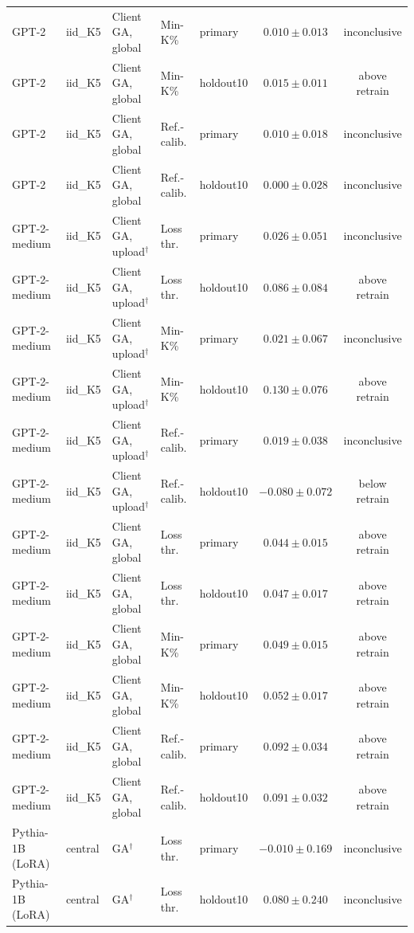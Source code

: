\begin{table}[t]
\begin{tabular*}{\textwidth}{@{\extracolsep{\fill}}lllllcc@{}}
GPT-2 & iid\_K5 & Client GA, global & Min-K\% & primary & $0.010 \pm 0.013$ & inconclusive \\
GPT-2 & iid\_K5 & Client GA, global & Min-K\% & holdout10 & $0.015 \pm 0.011$ & above retrain \\
GPT-2 & iid\_K5 & Client GA, global & Ref.-calib. & primary & $0.010 \pm 0.018$ & inconclusive \\
GPT-2 & iid\_K5 & Client GA, global & Ref.-calib. & holdout10 & $0.000 \pm 0.028$ & inconclusive \\
GPT-2-medium & iid\_K5 & Client GA, upload$^{\dagger}$ & Loss thr. & primary & $0.026 \pm 0.051$ & inconclusive \\
GPT-2-medium & iid\_K5 & Client GA, upload$^{\dagger}$ & Loss thr. & holdout10 & $0.086 \pm 0.084$ & above retrain \\
GPT-2-medium & iid\_K5 & Client GA, upload$^{\dagger}$ & Min-K\% & primary & $0.021 \pm 0.067$ & inconclusive \\
GPT-2-medium & iid\_K5 & Client GA, upload$^{\dagger}$ & Min-K\% & holdout10 & $0.130 \pm 0.076$ & above retrain \\
GPT-2-medium & iid\_K5 & Client GA, upload$^{\dagger}$ & Ref.-calib. & primary & $0.019 \pm 0.038$ & inconclusive \\
GPT-2-medium & iid\_K5 & Client GA, upload$^{\dagger}$ & Ref.-calib. & holdout10 & $-0.080 \pm 0.072$ & below retrain \\
GPT-2-medium & iid\_K5 & Client GA, global & Loss thr. & primary & $0.044 \pm 0.015$ & above retrain \\
GPT-2-medium & iid\_K5 & Client GA, global & Loss thr. & holdout10 & $0.047 \pm 0.017$ & above retrain \\
GPT-2-medium & iid\_K5 & Client GA, global & Min-K\% & primary & $0.049 \pm 0.015$ & above retrain \\
GPT-2-medium & iid\_K5 & Client GA, global & Min-K\% & holdout10 & $0.052 \pm 0.017$ & above retrain \\
GPT-2-medium & iid\_K5 & Client GA, global & Ref.-calib. & primary & $0.092 \pm 0.034$ & above retrain \\
GPT-2-medium & iid\_K5 & Client GA, global & Ref.-calib. & holdout10 & $0.091 \pm 0.032$ & above retrain \\
Pythia-1B (LoRA) & central & GA$^{\dagger}$ & Loss thr. & primary & $-0.010 \pm 0.169$ & inconclusive \\
Pythia-1B (LoRA) & central & GA$^{\dagger}$ & Loss thr. & holdout10 & $0.080 \pm 0.240$ & inconclusive \\

\end{tabular*}
\end{table}
